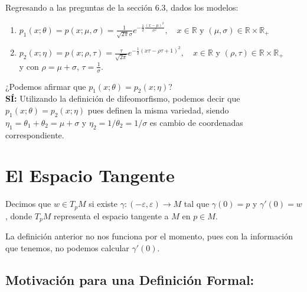 \begin{observation}
Regresando a las preguntas de la secci\'on 6.3, dados los modelos:
    \begin{enumerate}[label=(\alph*)]
        \item $p_1(x;\theta)=p(x;\mu,\sigma)=\frac{1}{\sqrt{2\pi}\sigma}e^{-\frac{1}{2}\frac{(x-\mu)^2}{\sigma^2}},\quad x\in\mathbb{R}\text{ y }(\mu,\sigma)\in\mathbb{R}\times\mathbb{R}_+$
        \item $p_2(x;\eta)=p(x;\rho,\tau)=\frac{\tau}{\sqrt{2\pi}}e^{-\frac{1}{2}(x\tau-\rho\tau+1)^2},\quad x\in\mathbb{R}\text{ y }(\rho,\tau)\in\mathbb{R}\times\mathbb{R}_+$\\
        y con $\rho=\mu+\sigma$, $\tau=\frac{1}{\sigma}$.
    \end{enumerate}
¿Podemos afirmar que $p_1(x;\theta)=p_2(x;\eta)$?\\

\noindent\textbf{S\'I:} Utilizando la definici\'on de difeomorfismo, podemos decir que $p_1(x;\theta)=p_2(x;\eta)$ pues definen la misma variedad, 
siendo $\eta_1=\theta_1+\theta_2=\mu+\sigma$ y $\eta_2=1/\theta_2=1/\sigma$ es cambio de coordenadas correspondiente.
\end{observation}

\section{El Espacio Tangente}
\begin{definition}
Decimos que $w\in T_pM$ si existe $\gamma\colon(-\varepsilon,\varepsilon)\to M$ tal que $\gamma(0)=p$ y  $\gamma'(0)=w$, donde $T_pM$ representa el espacio tangente a $M$ en $p\in M$.   
\end{definition}

\begin{observation}
La definici\'on anterior no nos funciona por el momento, pues con la informaci\'on que tenemos, no podemos calcular $\gamma'(0)$.    
\end{observation}

\subsection*{Motivaci\'on para una Definici\'on Formal:}

